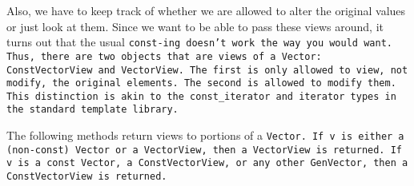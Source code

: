 Also, we have to 
keep track of whether we are allowed to alter the original values or
just look at them.  
Since we want to be able to pass these views around, it turns out that
the usual \tt{const}-ing doesn't work the way you would want.
Thus, there are two objects that are views of a
\tt{Vector}:
\tt{ConstVectorView} and \tt{VectorView}.  
The first is only allowed to view,
not modify, the original elements.  The second is allowed to modify them.
This distinction is akin to the \tt{const\_iterator} and \tt{iterator} types in the
standard template library.

The following methods return views to portions of a \tt{Vector}.
If \tt{v} is either a (non-\tt{const}) \tt{Vector}
or a \tt{VectorView}, then a \tt{VectorView} is returned.
If \tt{v} is a \tt{const Vector}, a \tt{ConstVectorView}, or any other \tt{GenVector},
then a \tt{ConstVectorView} is returned.  

